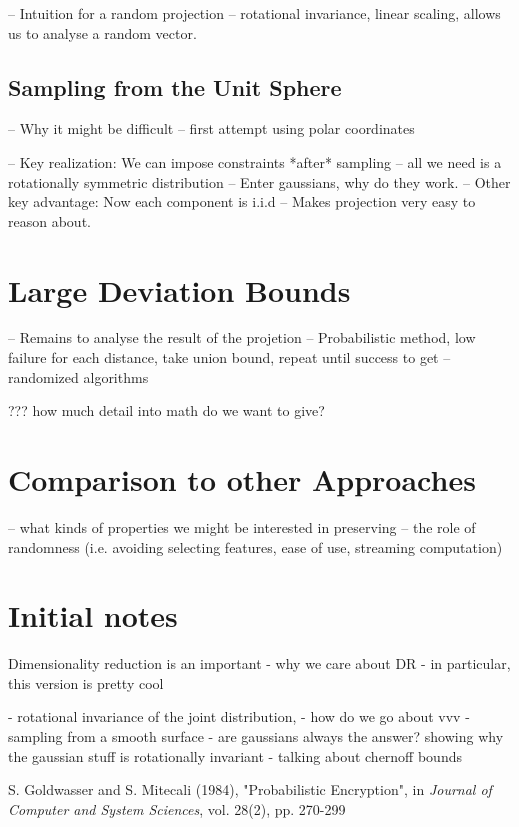 \documentclass[11pt]{article}
\newcommand{\ir}[1]{\textnormal{\sc#1}}
\begin{document}
-- Intuition for a random projection
-- rotational invariance, linear scaling, allows us to analyse a random vector.

\subsection{Sampling from the Unit Sphere}
-- Why it might be difficult
-- first attempt using polar coordinates

-- Key realization: We can impose constraints *after* sampling
   -- all we need is a rotationally symmetric distribution
-- Enter gaussians, why do they work.
-- Other key advantage: Now each component is i.i.d
    -- Makes projection very easy to reason about.

\section{Large Deviation Bounds}
-- Remains to analyse the result of the projetion
-- Probabilistic method, low failure for each distance, take union bound, repeat until success to get
-- randomized algorithms

??? how much detail into math do we want to give?


\section{Comparison to other Approaches}
-- what kinds of properties we might be interested in preserving
-- the role of randomness (i.e. avoiding selecting features, ease of use, streaming computation)


\section{Initial notes}

Dimensionality reduction is an important 
- why we care about DR
- in particular, this version is pretty cool

- rotational invariance of the joint distribution, 
- how do we go about vvv 
- sampling from a smooth surface
- are gaussians always the answer?
showing why the gaussian stuff is rotationally invariant
- talking about chernoff bounds

\begin{thebibliography}{1}
     \ir{S. Goldwasser and S. Mitecali} (1984), "Probabilistic Encryption", in \textit{Journal of Computer and System Sciences}, vol. 28(2), pp. 270-299
        
\end{thebibliography}
\end{document}
